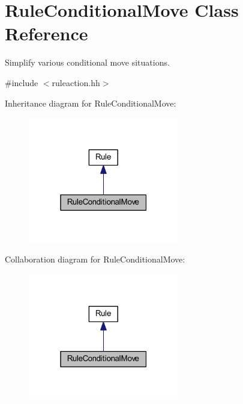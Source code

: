 \hypertarget{class_rule_conditional_move}{}\section{Rule\+Conditional\+Move Class Reference}
\label{class_rule_conditional_move}


Simplify various conditional move situations.  




{\ttfamily \#include $<$ruleaction.\+hh$>$}



Inheritance diagram for Rule\+Conditional\+Move\+:
\nopagebreak
\begin{figure}[H]
\begin{center}
\leavevmode
\includegraphics[width=187pt]{class_rule_conditional_move__inherit__graph}
\end{center}
\end{figure}


Collaboration diagram for Rule\+Conditional\+Move\+:
\nopagebreak
\begin{figure}[H]
\begin{center}
\leavevmode
\includegraphics[width=187pt]{class_rule_conditional_move__coll__graph}
\end{center}
\end{figure}
